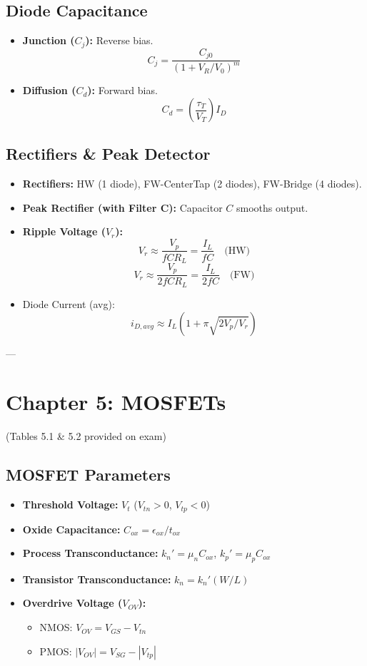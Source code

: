 \documentclass[10pt]{article}
\begin{document}
\begin{multicols*}{2}
\subsection*{Diode Capacitance}
\begin{itemize}\itemsep0pt
    \item \textbf{Junction ($C_j$):} Reverse bias.
    \[ C_j = \frac{C_{j0}}{(1 + V_R/V_0)^m} \]
    \item \textbf{Diffusion ($C_d$):} Forward bias.
    \[ C_d = \left(\frac{\tau_T}{V_T}\right) I_D \]
\end{itemize}

\subsection*{Rectifiers \& Peak Detector}
\begin{itemize}\itemsep0pt
    \item \textbf{Rectifiers:} HW (1 diode), FW-CenterTap (2 diodes), FW-Bridge (4 diodes).
    \item \textbf{Peak Rectifier (with Filter C):}
    Capacitor $C$ smooths output.
    \item \textbf{Ripple Voltage ($V_r$):}
    \[ V_r \approx \frac{V_p}{fCR_L} = \frac{I_L}{fC} \quad \text{(HW)} \]
    \[ V_r \approx \frac{V_p}{2fCR_L} = \frac{I_L}{2fC} \quad \text{(FW)} \]
    \item Diode Current (avg):
    \[ i_{D,avg} \approx I_L(1 + \pi\sqrt{2V_p/V_r}) \]
\end{itemize}

--- %

\section{Chapter 5: MOSFETs}
(Tables 5.1 \& 5.2 provided on exam)

\subsection*{MOSFET Parameters}
\begin{itemize}\itemsep0pt
    \item \textbf{Threshold Voltage:} $V_t$ ($V_{tn} > 0$, $V_{tp} < 0$)
    \item \textbf{Oxide Capacitance:} $C_{ox} = \epsilon_{ox} / t_{ox}$
    \item \textbf{Process Transconductance:} $k_n' = \mu_n C_{ox}$, $k_p' = \mu_p C_{ox}$
    \item \textbf{Transistor Transconductance:} $k_n = k_n'(W/L)$
    \item \textbf{Overdrive Voltage ($V_{OV}$):}
    \begin{itemize}\itemsep0pt
        \item NMOS: $V_{OV} = V_{GS} - V_{tn}$
        \item PMOS: $|V_{OV}| = V_{SG} - |V_{tp}|$
    \end{itemize}
\end{itemize}


\end{multicols*}
\end{document}
